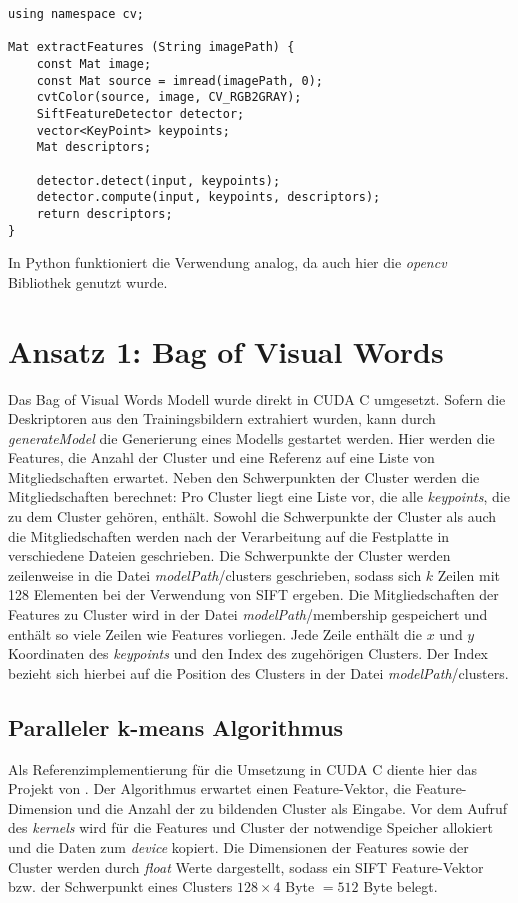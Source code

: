 \lstset{language=C}
\begin{lstlisting}
using namespace cv;

Mat extractFeatures (String imagePath) {
	const Mat image;
	const Mat source = imread(imagePath, 0);
	cvtColor(source, image, CV_RGB2GRAY);
	SiftFeatureDetector detector;
	vector<KeyPoint> keypoints;
	Mat descriptors;
	
	detector.detect(input, keypoints);
	detector.compute(input, keypoints, descriptors);
	return descriptors;
}
\end{lstlisting}

In Python funktioniert die Verwendung analog, da auch hier die \textit{opencv} Bibliothek genutzt wurde.

\section{Ansatz 1: Bag of Visual Words}

Das Bag of Visual Words Modell wurde direkt in CUDA C umgesetzt. Sofern die Deskriptoren aus den Trainingsbildern extrahiert wurden, kann durch \textit{generateModel} die Generierung eines Modells gestartet werden. Hier werden die Features, die Anzahl der Cluster und eine Referenz auf eine Liste von Mitgliedschaften erwartet. Neben den Schwerpunkten der Cluster werden die Mitgliedschaften berechnet: Pro Cluster liegt eine Liste vor, die alle \textit{keypoints}, die zu dem Cluster gehören, enthält. Sowohl die Schwerpunkte der Cluster als auch die Mitgliedschaften werden nach der Verarbeitung auf die Festplatte in verschiedene Dateien geschrieben. Die Schwerpunkte der Cluster werden zeilenweise in die Datei \textit{modelPath}/clusters geschrieben, sodass sich $k$ Zeilen mit 128 Elementen bei der Verwendung von SIFT ergeben. Die Mitgliedschaften der Features zu Cluster wird in der Datei \textit{modelPath}/membership gespeichert und enthält so viele Zeilen wie Features vorliegen. Jede Zeile enthält die $x$ und $y$ Koordinaten des \textit{keypoints} und den Index des zugehörigen Clusters. Der Index bezieht sich hierbei auf die Position des Clusters in der Datei \textit{modelPath}/clusters.

\subsection{Paralleler k-means Algorithmus}

Als Referenzimplementierung für die Umsetzung in CUDA C diente hier das Projekt von \todo{[REF]}. Der Algorithmus erwartet einen Feature-Vektor, die Feature-Dimension und die Anzahl der zu bildenden Cluster als Eingabe. Vor dem Aufruf des \textit{kernels} wird für die Features und Cluster der notwendige Speicher allokiert und die Daten zum \textit{device} kopiert. Die Dimensionen der Features sowie der Cluster werden durch \textit{float} Werte dargestellt, sodass ein SIFT Feature-Vektor bzw. der Schwerpunkt eines Clusters $128 \times 4$ Byte $= 512$ Byte belegt. 

